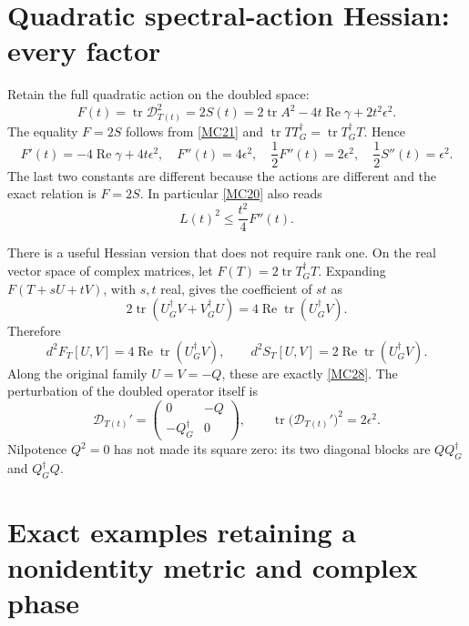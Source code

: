 \documentclass[11pt]{article}
\newcommand{\tr}{\operatorname{tr}}
\newcommand{\Rea}{\operatorname{Re}}
\newcommand{\adj}{\dagger_G}
\begin{document}
\section{Quadratic spectral-action Hessian: every factor}

Retain the full quadratic action on the doubled space:
\begin{equation}
 F(t)=\tr\mathcal D_{T(t)}^2
      =2S(t)
      =2\tr A^2-4t\Rea\gamma+2t^2\epsilon^2.
 \tag{MC27}\label{MC27}
\end{equation}
The equality \(F=2S\) follows from \eqref{MC21} and
\(\tr TT^\adj=\tr T^\adj T\). Hence
\begin{equation}
 F'(t)=-4\Rea\gamma+4t\epsilon^2,\quad
 F''(t)=4\epsilon^2,\quad
 \frac12F''(t)=2\epsilon^2,\quad
 \frac12S''(t)=\epsilon^2.
 \tag{MC28}\label{MC28}
\end{equation}
The last two constants are different because the actions are different
and the exact relation is \(F=2S\). In particular \eqref{MC20} also reads
\begin{equation}
 L(t)^2\le\frac{t^2}{4}F''(t).
 \tag{MC29}\label{MC29}
\end{equation}

There is a useful Hessian version that does not require rank one.
On the real vector space of complex matrices, let
\(F(T)=2\tr T^\adj T\). Expanding \(F(T+sU+tV)\), with \(s,t\)
real, gives the coefficient of \(st\) as
\[
 2\tr(U^\adj V+V^\adj U)=4\Rea\tr(U^\adj V).
\]
Therefore
\begin{equation}
 d^2F_T[U,V]=4\Rea\tr(U^\adj V),\qquad
 d^2S_T[U,V]=2\Rea\tr(U^\adj V).
 \tag{MC30}\label{MC30}
\end{equation}
Along the original family \(U=V=-Q\), these are exactly \eqref{MC28}.
The perturbation of the doubled operator itself is
\[
 \mathcal D_{T(t)}'=
 \begin{pmatrix}0&-Q\\-Q^\adj&0\end{pmatrix},
 \qquad
 \tr\bigl(\mathcal D_{T(t)}'\bigr)^2=2\epsilon^2.
\]
Nilpotence \(Q^2=0\) has not made its square zero: its two diagonal
blocks are \(QQ^\adj\) and \(Q^\adj Q\).

\section{Exact examples retaining a nonidentity metric and complex phase}
\end{document}

